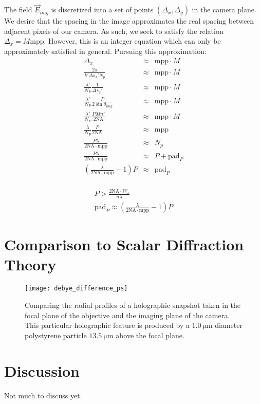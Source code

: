   The field $\vec{E}_{img}$ is discretized into a set of points 
  $\left ( \Delta_x, \Delta_y \right )$ in the camera plane. We desire that the
  spacing in the image approximates the real spacing between adjacent 
  pixels of our camera. As such, we seek to satisfy the relation 
  $\Delta_x = M\text{mpp}$. However, this is an integer equation which can only
  be approximately satisfied in general. Pursuing this approximation:
  \begin{eqnarray*}
    \Delta_x &\approx& \text{mpp}\cdot M \\
    \frac{2 \pi}{k' \Delta s_x' N_p} &\approx& \text{mpp}\cdot M \\
    \frac{\lambda'}{N_P} \frac{1}{\Delta s_x'} &\approx& \text{mpp}\cdot M \\
    \frac{\lambda'}{N_P} \frac{P}{2 \sin{\theta_{img}}} &\approx& \text{mpp}\cdot M \\
    \frac{\lambda'}{N_P} \frac{PMn'}{2\text{NA}} &\approx& \text{mpp}\cdot M \\
    \frac{\lambda}{N_P} \frac{P}{2\text{NA}} &\approx& \text{mpp} \\
    \frac{P\lambda}{2\text{NA}\cdot\text{mpp}} &\approx& N_p \\
    \frac{P\lambda}{2\text{NA}\cdot\text{mpp}} &\approx& P+\text{pad}_P \\
    \left ( \frac{\lambda}{2\text{NA}\cdot\text{mpp}} - 1 \right )P &\approx& \text{pad}_P \\    
  \end{eqnarray*}

  \begin{equation*}
    \begin{split}
      P > \frac{2 \text{NA}\cdot W_x}{n\lambda} \\
      \text{pad}_P  \approx  \left ( \frac{\lambda}{2\text{NA}\cdot\text{mpp}} - 1 \right )P
    \end{split}
  \end{equation*}


  
\section{Comparison to Scalar Diffraction Theory}


\begin{figure}
  \centering
  \texttt{[image: debye\_difference\_ps]}
  \caption{Comparing the radial profiles of a holographic snapshot taken
    in the focal plane of the objective and the imaging plane of the camera.
    This particular holographic feature is produced by a $\SI{1.0}{\um}$
    diameter polystyrene particle $\SI{13.5}{\um}$ above the focal plane.}
  \label{fig:debye_difference_ps}
\end{figure}


\section{Discussion}

Not much to discuss yet.


